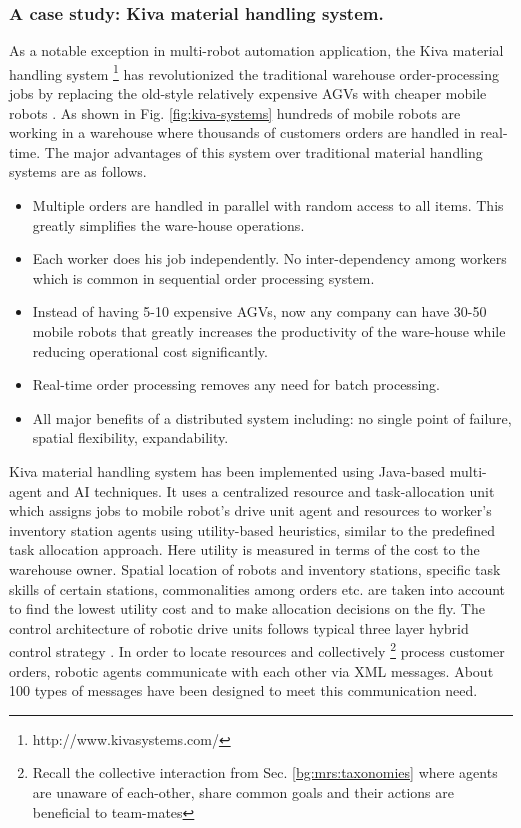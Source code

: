 \subsubsection*{A case study:  Kiva material handling system.}
 As a notable exception in multi-robot automation application, the Kiva material handling system \footnote{http://www.kivasystems.com/}  has revolutionized the traditional warehouse order-processing jobs by replacing the old-style relatively expensive AGVs with cheaper mobile robots \cite{Wurman+2008}. As shown in Fig. \ref{fig:kiva-systems} hundreds of mobile robots are working in a warehouse where thousands of customers orders are handled in real-time. The major advantages of this system over traditional material handling systems are as follows.
 \begin{itemize}
\item Multiple orders are handled in parallel with random access to all items. This greatly simplifies the ware-house operations.
\item Each worker does his job independently. No inter-dependency among workers which is common in sequential order processing system.
\item Instead of having 5-10 expensive AGVs, now any company can have 30-50 mobile robots  that greatly increases the productivity of the ware-house while reducing operational cost significantly.
\item Real-time order processing removes any need for batch processing.
\item All major benefits of a distributed system including: no single point of failure, spatial flexibility, expandability.
\end{itemize}
%
Kiva material handling system has been implemented using Java-based multi-agent and AI techniques. It uses a centralized  resource and task-allocation unit which assigns jobs to mobile robot's drive unit agent and resources to worker's inventory station agents using utility-based heuristics, similar to the predefined task allocation approach. Here utility is measured in terms of the cost to the warehouse owner. Spatial location of robots and inventory stations, specific task skills of certain stations, commonalities among orders etc. are taken into account to find the lowest utility cost and to make allocation decisions on the fly. The control architecture of robotic drive units follows typical three layer hybrid control strategy \cite{Simmons+2002}. In order to locate resources and collectively \footnote{Recall the collective interaction  from Sec. \ref{bg:mrs:taxonomies} where agents are unaware of each-other, share common goals and their actions are beneficial to team-mates} process customer orders, robotic agents communicate with each other via XML messages. About 100 types of messages have been designed to meet this communication need.\\
